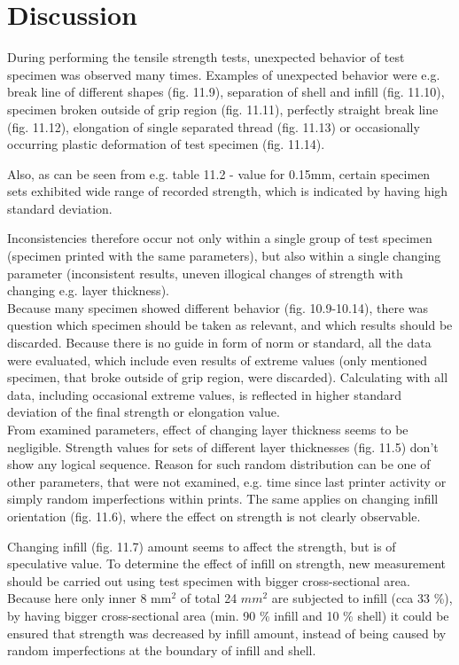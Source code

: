 \documentclass[a4paper, 11pt, reqno]{report}
\begin{document}
\section{Discussion}
During performing the tensile strength tests, unexpected behavior of test specimen was observed many times. Examples of unexpected behavior were e.g. break line of different shapes (fig. 11.9), separation of shell and infill (fig. 11.10), specimen broken outside of grip region (fig. 11.11), perfectly straight break line (fig. 11.12), elongation of single separated thread (fig. 11.13) or occasionally occurring plastic deformation of test specimen (fig. 11.14).

	 Also, as can be seen from e.g. table 11.2 - value for 0.15mm, certain specimen sets exhibited wide range of recorded strength, which is indicated by having high standard deviation.

	Inconsistencies therefore occur not only within a single group of test specimen (specimen printed with the same parameters), but also within a single changing parameter (inconsistent results, uneven illogical changes of strength with changing e.g. layer thickness).
\\

	Because many specimen showed different behavior (fig. 10.9-10.14), there was question which specimen should be taken as relevant, and which results should be discarded. Because there is no guide in form of norm or standard, all the data were evaluated, which include even results of extreme values (only mentioned specimen, that broke outside of grip region, were discarded). Calculating with  all data, including occasional extreme values, is reflected in higher standard deviation of the final strength or elongation value.
\\

	From examined parameters, effect of changing layer thickness seems to be negligible. Strength values for sets of different layer thicknesses (fig. 11.5) don't show any logical sequence. Reason for such random distribution can be one of other parameters, that were not examined, e.g. time since last printer activity or simply random imperfections within prints. The same applies on changing infill orientation (fig. 11.6), where the effect on strength is not clearly observable.
	
	Changing infill (fig. 11.7) amount seems to affect the strength, but is of speculative value. To determine the effect of infill on strength, new measurement should be carried out using test specimen with bigger cross-sectional area. Because here only inner 8 mm$^2$ of total 24 $mm^2$ are subjected to infill (cca 33 \%), by having bigger cross-sectional area  (min. 90 \% infill and 10 \% shell) it could be ensured that strength was decreased by infill amount, instead of being caused by random imperfections at the boundary of infill and shell.
	
\end{document}

